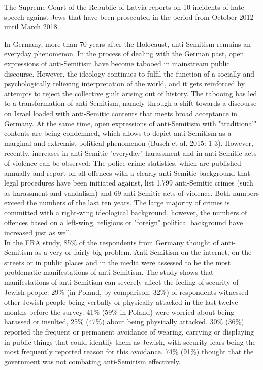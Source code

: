 The Supreme Court of the Republic of Latvia reports on 10 incidents of hate speech against Jews that have been prosecuted in the period from October 2012 until March 2018. \par
In Germany, more than 70 years after the Holocaust, anti-Semitism remains an everyday phenomenon. In the process of dealing with the German past, open expressions of anti-Semitism have become tabooed in mainstream public discourse. However, the ideology continues to fulfil the function of a socially and psychologically relieving interpretation of the world, and it gets reinforced by attempts to reject the collective guilt arising out of history. The tabooing has led to a transformation of anti-Semitism, namely through a shift towards a discourse on Israel loaded with anti-Semitic contents that meets broad acceptance in Germany. At the same time, open expressions of anti-Semitism with "traditional" contents are being condemned, which allows to depict anti-Semitism as a marginal and extremist political phenomenon (Busch et al. 2015: 1-3). However, recently, increases in anti-Semitic "everyday" harassment and in anti-Semitic acts of violence can be observed: The police crime statistics, which are published annually and report on all offences with a clearly anti-Semitic background that legal procedures have been initiated against, list 1,799 anti-Semitic crimes (such as harassment and vandalism) and 69 anti-Semitic acts of violence. Both numbers exceed the numbers of the last ten years. The large majority of crimes is committed with a right-wing ideological background, however, the numbers of offences based on a left-wing, religious or "foreign" political background have increased just as well. \\
In the FRA study, 85\% of the respondents from Germany thought of anti-Semitism as a very or fairly big problem. Anti-Semitism on the internet, on the streets or in public places and in the media were assessed to be the most problematic manifestations of anti-Semitism. The study shows that manifestations of anti-Semitism can severely affect the feeling of security of Jewish people: 29\% (in Poland, by comparison, 32\%) of respondents witnessed other Jewish people being verbally or physically attacked in the last twelve months before the survey. 41\% (59\% in Poland) were worried about being harassed or insulted, 25\% (47\%) about being physically attacked. 30\% (36\%) reported the frequent or permanent avoidance of wearing, carrying or displaying in public things that could identify them as Jewish, with security fears being the most frequently reported reason for this avoidance. 74\% (91\%) thought that the government was not combating anti-Semitism effectively.\\  
